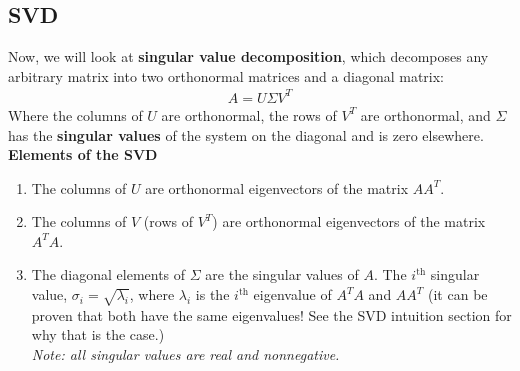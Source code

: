 \subsection*{SVD}
Now, we will look at \textbf{singular value decomposition}, which decomposes any arbitrary matrix into two orthonormal matrices and a diagonal matrix:
\begin{align*}
    \boxed{A = U \Sigma V^T} 
\end{align*}
Where the columns of $U$ are orthonormal, the rows of $V^T$ are orthonormal, and $\Sigma$ has the \textbf{singular values} of the system on the diagonal and is zero elsewhere. \\
\newline
\textbf{Elements of the SVD}
\begin{enumerate}
    \item The columns of $U$ are orthonormal eigenvectors of the matrix $AA^T$.
    \item The columns of $V$ (rows of $V^T$) are orthonormal eigenvectors of the matrix $A^T A$.
    \item The diagonal elements of $\Sigma$ are the singular values of $A$. The $i^{\text{th}}$ singular value, $\sigma_i = \sqrt{\lambda_i}$, where $\lambda_i$ is the $i^{\text{th}}$ eigenvalue of $A^T A$ and $A A^T$ (it can be proven that both have the same eigenvalues! See the SVD intuition section for why that is the case.) \\
    \textit{Note: all singular values are real and nonnegative.}
\end{enumerate}


